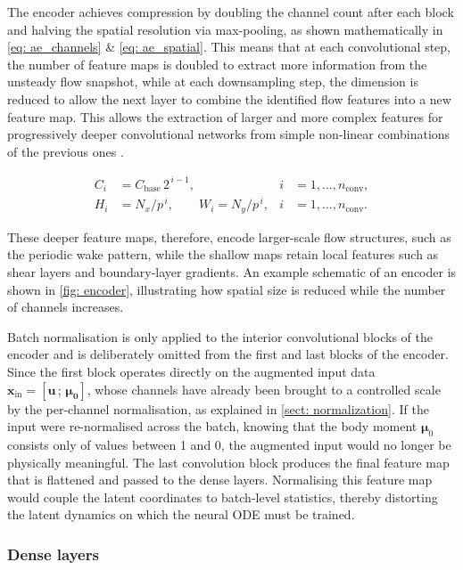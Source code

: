 The encoder achieves compression by doubling the channel count after each block and halving the spatial resolution via max-pooling, as shown mathematically in \autoref{eq: ae_channels} \& \ref{eq: ae_spatial}. This means that at each convolutional step, the number of feature maps is doubled to extract more information from the unsteady flow snapshot, while at each downsampling step, the dimension is reduced to allow the next layer to combine the identified flow features into a new feature map. This allows the extraction of larger and more complex features for progressively deeper convolutional networks from simple non-linear combinations of the previous ones \cite{Eivazi2022}.

\begin{align}
    C_i &= C_\text{base}\, 2^{\,i-1}, & i &= 1, \dots, n_\text{conv}, 
    \label{eq: ae_channels} \\
    H_i &= N_x / p^{\,i}, \qquad W_i = N_y / p^{\,i}, & i &= 1, \dots, n_\text{conv}.
    \label{eq: ae_spatial}
\end{align}

 These deeper feature maps, therefore, encode larger-scale flow structures, such as the periodic wake pattern, while the shallow maps retain local features such as shear layers and boundary-layer gradients. An example schematic of an encoder is shown in \autoref{fig: encoder}, illustrating how spatial size is reduced while the number of channels increases.

 Batch normalisation is only applied to the interior convolutional blocks of the encoder and is deliberately omitted from the first and last blocks of the encoder. Since the first block operates directly on the augmented input data $\mathbf{x}_\text{in} = [\mathbf{u}\,;\,\boldsymbol{\mu_0}]$, whose channels have already been brought to a controlled scale by the per-channel normalisation, as explained in \autoref{sect: normalization}. If the input were re-normalised across the batch, knowing that the body moment $\boldsymbol{\mu}_0$ consists only of values between 1 and 0, the augmented input would no longer be physically meaningful. The last convolution block produces the final feature map that is flattened and passed to the dense layers. Normalising this feature map would couple the latent coordinates to batch-level statistics, thereby distorting the latent dynamics on which the neural ODE must be trained. 


\subsubsection{Dense layers}

